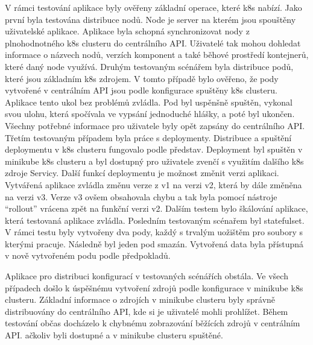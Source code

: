         V rámci testování aplikace byly ověřeny základní operace, které k8s nabízí. Jako první byla testována distribuce nodů. Node je server na kterém jsou spouštěny uživatelské aplikace. Aplikace byla schopná synchronizovat nody z plnohodnotného k8s clusteru do centrálního API. Uživatelé tak mohou dohledat informace o názvech nodů, verzích komponent a také běhové prostředí kontejnerů, které daný node využívá. \linebreak Druhým testovaným scénářem byla distribuce podů, které jsou základním k8s zdrojem. V tomto případě bylo ověřeno, že pody vytvořené v centrálním API jsou podle konfigurace spuštěny k8s clusteru. Aplikace tento ukol bez problémů zvládla. Pod byl uspěnšně spuštěn, vykonal svou ulohu, která spočívala ve vypsání jednoduché hlášky, a poté byl ukončen. Všechny potřebné informace pro uživatele byly opět zapsány do centrálního API. Třetím testovaným případem byla práce s deploymenty. Distribuce a spuštění deploymentu v k8s clusteru fungovalo podle představ. Deployment byl spuštěn v minikube k8s clusteru a byl dostupný pro uživatele zvenčí s využitím dalšího k8s zdroje Servicy. Další funkcí deploymentu je možnost změnit verzi aplikaci. Vytvářená aplikace zvládla změnu verze z v1 na verzi v2, která by dále změněna na verzi v3. Verze v3 ovšem obsahovala chybu a tak byla pomocí nástroje “rollout” vrácena zpět na funkční verzi v2. Dalším testem bylo škálování aplikace, která testovaná aplikace zvládla. Posledním testovaným scénařem byl statefulset. V rámci testu byly vytvořeny dva pody, každý s trvalým uožištěm pro soubory s kterými pracuje. Následně byl jeden pod smazán. Vytvořená data byla přístupná v nově vytvořeném podu podle předpokladů.\par
	    Aplikace pro distribuci konfigurací v testovaných scénářích obstála. Ve všech případech došlo k úspěšnému vytvoření zdrojů podle konfigurace v minikube k8s clusteru. Základní informace o zdrojích v minikube clusteru byly správně distribuovány do centrálního API, kde si je uživatelé mohli prohlížet. Během testování občas docházelo k chybnému zobrazování běžících zdrojů v centrálním API. ačkoliv byli dostupné a v minikube clusteru spuštěné. 

